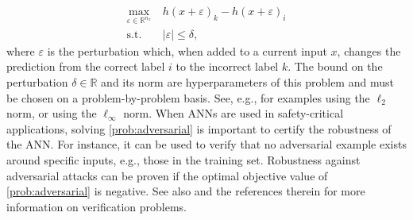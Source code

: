 \begin{equation}\label{prob:adversarial}
    \begin{aligned}
        \max_{\varepsilon \in \mathbb{R}^{n_x}}\ & h(x+\varepsilon)_k - h(x+\varepsilon)_i \\
        \textrm{s.t.}\ & \lvert \varepsilon \rvert \leq \delta,
    \end{aligned}
\end{equation}
where $\varepsilon$ is the perturbation which, when added to a current input $x$, changes the prediction from the correct label $i$ to the incorrect label $k$. The bound on the perturbation $\delta \in \mathbb{R}$ and its norm are hyperparameters of this problem and must be chosen on a problem-by-problem basis. See, e.g., \citet{Hein2017} for examples using the $\ell_2$ norm, or \citet{Tjeng2019} using the  $\ell_\infty$ norm. When ANNs are used in safety-critical applications, solving \eqref{prob:adversarial} is important to certify the robustness of the ANN. For instance, it can be used to verify that no adversarial example exists around specific inputs, e.g., those in the training set. Robustness against adversarial attacks can be proven if the optimal objective value of \eqref{prob:adversarial} is negative. See also \citet{Rossig2021} and the references therein for more information on verification problems. 

